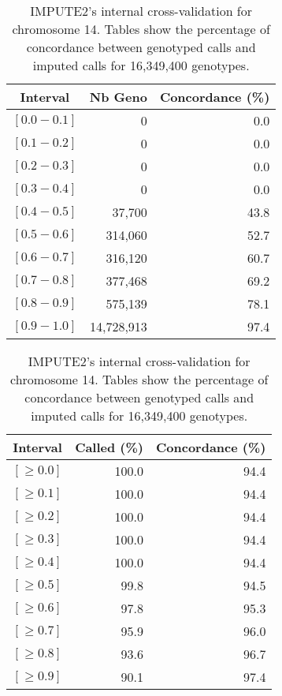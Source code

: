 \documentclass[10pt,twoside,english]{scrartcl}
\begin{document}
\begin{table}[H]
\protect\caption{IMPUTE2's internal cross-validation for chromosome 14. Tables show the
percentage of concordance between genotyped calls and imputed calls
for 16,349,400 genotypes.\label{tab:cross_validation_chr_14}}

\centering

\begin{tabular}{crr}
\hline 
\multicolumn{1}{c}{\textbf{Interval}}
 & \multicolumn{1}{c}{\textbf{Nb Geno}}
 & \multicolumn{1}{c}{\textbf{Concordance (\%)}}
\\
\hline 

$[0.0-0.1]$ & 0 & 0.0\\
$[0.1-0.2]$ & 0 & 0.0\\
$[0.2-0.3]$ & 0 & 0.0\\
$[0.3-0.4]$ & 0 & 0.0\\
$[0.4-0.5]$ & 37,700 & 43.8\\
$[0.5-0.6]$ & 314,060 & 52.7\\
$[0.6-0.7]$ & 316,120 & 60.7\\
$[0.7-0.8]$ & 377,468 & 69.2\\
$[0.8-0.9]$ & 575,139 & 78.1\\
$[0.9-1.0]$ & 14,728,913 & 97.4\\
\hline 
\end{tabular}
\hfill
\begin{tabular}{crr}
\hline 
\multicolumn{1}{c}{\textbf{Interval}}
 & \multicolumn{1}{c}{\textbf{Called (\%)}}
 & \multicolumn{1}{c}{\textbf{Concordance (\%)}}
\\
\hline 

$[\geq 0.0]$ & 100.0 & 94.4\\
$[\geq 0.1]$ & 100.0 & 94.4\\
$[\geq 0.2]$ & 100.0 & 94.4\\
$[\geq 0.3]$ & 100.0 & 94.4\\
$[\geq 0.4]$ & 100.0 & 94.4\\
$[\geq 0.5]$ & 99.8 & 94.5\\
$[\geq 0.6]$ & 97.8 & 95.3\\
$[\geq 0.7]$ & 95.9 & 96.0\\
$[\geq 0.8]$ & 93.6 & 96.7\\
$[\geq 0.9]$ & 90.1 & 97.4\\
\hline 
\end{tabular}


\end{table}
\end{document}
